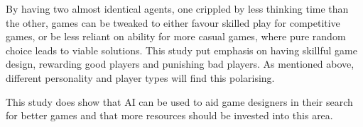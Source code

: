 By having two almost identical agents, one crippled by less thinking time than the other, games can be tweaked to either favour skilled play for competitive games, or be less reliant on ability for more casual games, where pure random choice leads to viable solutions. This study put emphasis on having skillful game design, rewarding good players and punishing bad players. As mentioned above, different personality and player types will find this polarising. 

This study does show that AI can be used to aid game designers in their search for better games and that more resources should be invested into this area.
